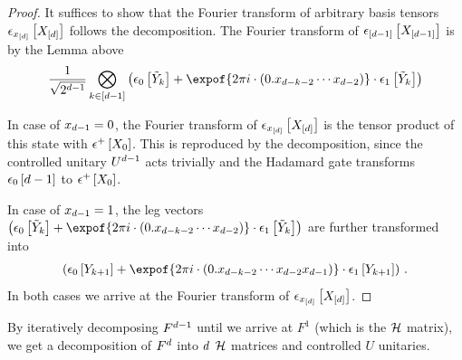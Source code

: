 \begin{proof}
    It suffices to show that the Fourier transform of arbitrary basis tensors $\epsilon_{x_{[d]}}\left[X_{[d]}\right]$ follows the decomposition.
    The Fourier transform of $\epsilon_{[d-1]}\left[X_{[d-1]}\right]$ is by the Lemma above
    \begin{align*}
        \frac{1}{\sqrt{2^{\catorder-1}}} \bigotimes_{\catenumerator\in[\catorder-1]}
        \left( \fbasisat{\tilde{\headvariable}_{\catenumerator}} + \expof{2\pi i \cdot (0.\catindexof{\catorder-\catenumerator-2}\cdots\catindexof{\catorder-2})}\cdot \tbasisat{\tilde{\headvariable}_{\catenumerator}}\right)
    \end{align*}

    In case of $x_{d-1}=0$, the Fourier transform of $\epsilon_{x_{[d]}}\left[X_{[d]}\right]$ is the tensor product of this state with $\epsilon^{+}\left[X_{0}\right]$.
    This is reproduced by the decomposition, since the controlled unitary $U^{d-1}$ acts trivially and the Hadamard gate transforms $\epsilon_{0}\left[d-1\right]$ to $\epsilon^{+}\left[X_{0}\right]$.

    In case of $x_{d-1}=1$, the leg vectors $\left( \fbasisat{\tilde{\headvariable}_{\catenumerator}} + \expof{2\pi i \cdot (0.\catindexof{\catorder-\catenumerator-2}\cdots\catindexof{\catorder-2})}\cdot \tbasisat{\tilde{\headvariable}_{\catenumerator}}\right)$ are further transformed into
    \begin{align*}
        \left( \fbasisat{\headvariableof{\catenumerator+1}} + \expof{2\pi i \cdot (0.\catindexof{\catorder-\catenumerator-2}\cdots\catindexof{\catorder-2}\catindexof{\catorder-1})}\cdot \tbasisat{\headvariableof{\catenumerator+1}}\right) \, .
    \end{align*}
    In both cases we arrive at the Fourier transform of $\epsilon_{x_{[d]}}\left[X_{[d]}\right]$.
\end{proof}

By iteratively decomposing $F^{d-1}$ until we arrive at $F^{1}$ (which is the $\mathcal{H}$ matrix), we get a decomposition of $F^{d}$ into $d$ $\mathcal{H}$ matrices and controlled $U$ unitaries.

